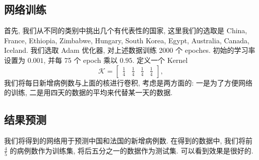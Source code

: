 \documentclass[UTF8]{ctexart}
\begin{document}
    \subsection*{网络训练}
    首先, 我们从不同的类别中挑出几个有代表性的国家, 这里我们的选取是 China, France, Ethiopia, Zimbabwe, Hungary, South Korea, Egypt, Australia, Canada, Iceland. 我们选取 Adam 优化器, 对上述数据训练 2000 个 epoches. 初始的学习率设置为 $0.001$, 并每 75 个 epoch 乘以 $0.95$. 定义一个 Kernel
	\[
	\mathcal{K} =
	\begin{bmatrix}
		\displaystyle\frac{1}{4}&\displaystyle\frac{1}{4}&\displaystyle\frac{1}{4}&\displaystyle\frac{1}{4}
	\end{bmatrix},
	\]
	我们将每日新增病例数与上面的核进行卷积, 考虑是两方面的: 一是为了方便网络的训练, 二是用四天的数据的平均来代替某一天的数据.
	\begin{figure}[htbp]
	    \centering
	\end{figure}
	\subsection*{结果预测}
	我们将得到的网络用于预测中国和法国的新增病例数. 在得到的数据中, 我们将前 $\frac{4}{5}$ 的病例数作为训练集, 将后五分之一的数据作为测试集. 可以看到效果是很好的.
	\begin{figure}[htbp]
	    \centering
	\end{figure}
\end{document}
